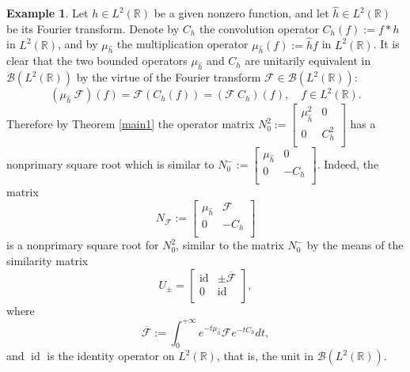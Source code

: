 \documentclass{article}
\theoremstyle{definition}
\newtheorem{example}{Example}[section]
\def\B{{\mathcal{B}}}
\def\RR{\mathbb{R}}
\def\id{\operatorname{id}}
\newcommand{\mat}[4]{\left[\begin{array}{cc}#1 & #2 \\ #3 & #4 \\
	\end{array}\right]}
\begin{document}
\begin{example} Let $h\in L^2(\RR)$ be a given nonzero function, and let $\widehat{h}\in L^2(\RR)$ be its Fourier transform. Denote by $C_h$ the convolution operator $C_h(f):=f*h$ in $L^2(\RR)$, and by $\mu_{\widehat{h}}$ the multiplication operator $\mu_{\widehat{h}}(f):=\widehat{h}f$ in $L^2(\RR)$. It is clear that the two bounded operators $\mu_{\widehat{h}}$ and $C_h$ are unitarily equivalent in $\B(L^2(\RR))$ by the virtue of the Fourier transform $\mathcal{F}\in\B(L^2(\RR))$:
$$\left(\mu_{\widehat{h}}\ \mathcal{F}\right)(f)=\mathcal{F}\left(C_h(f)\right)=\left(\mathcal{F} \ C_h\right)(f), \quad f\in L^2(\RR).$$ 
Therefore by Theorem \ref{main1} the operator matrix $N_0^2:=\mat{\mu^2_{\widehat{h}}}{0}{0}{C^2_h}$ has a nonprimary square root which is similar to $N_0^-:=\mat{\mu_{\widehat{h}}}{0}{0}{-C_h}$. Indeed, the matrix
$$N_{\mathcal{F}}:=\mat{\mu_{\widehat{h}}}{\mathcal{F}}{0}{-C_h}$$
is a nonprimary square root for $N_0^2$, similar to the matrix $N_0^-$ by the means of the similarity matrix
$$U_{\pm}=\mat{\id}{\pm\overline{\mathcal{F}}}{0}{\id},$$
where
$$\overline{\mathcal{F}}:=\int_0^{+\infty}e^{-t\mu_{\widehat{h}}}\mathcal{F}e^{-tC_h}dt,$$
and $\id$ is the identity operator on $L^2(\RR)$, that is, the unit in $\B(L^2(\RR))$. 


\end{example}
\end{document}
